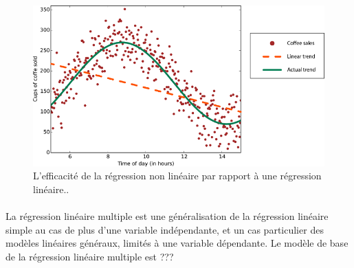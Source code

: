 			
	\begin{figure}[hth]%
		\centering
		\includegraphics[width=\textwidth]{images/nonlinear-trend.png}
		\caption{ L'efficacité de la régression non linéaire par rapport \`{a} une régression linéaire..}
		\label{fig:nonlinear_trend}
	\end{figure}

	\paragraph*{}
	La régression linéaire multiple est une généralisation de la régression linéaire simple au cas de plus d'une variable indépendante, et un cas particulier des modèles linéaires généraux, limités à une variable dépendante. Le modèle de base de la régression linéaire multiple est \n
	???
	
